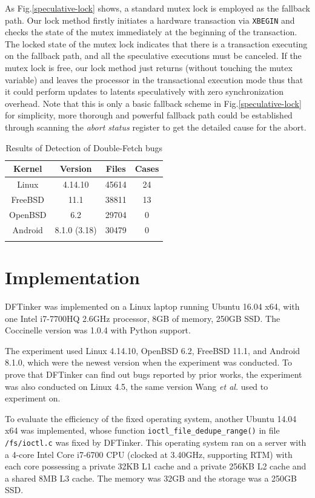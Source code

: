 \documentclass[10pt]{llncs}
\begin{document}
As Fig.\ref{speculative-lock} shows, a standard mutex lock is employed as the fallback path. 
Our lock method firstly initiates a hardware transaction via \verb:XBEGIN: and checks the state of the mutex immediately at the beginning of the transaction. The locked state of the mutex lock indicates that there is a transaction executing on the fallback path, and all the speculative executions must be canceled. 
If the mutex lock is free, our lock method just returns (without touching the mutex variable) and leaves the processor in the transactional execution mode thus that it could perform updates to latents speculatively with zero synchronization overhead. 
Note that this is only a basic fallback scheme in Fig.\ref{speculative-lock} for simplicity, 
more thorough and powerful fallback path could be established through scanning the \textit{abort status} register to get the detailed cause for the abort. 

\begin{table}[t]
  \centering
  \caption{Results of Detection of Double-Fetch bugs}
  \begin{tabular}{cccc}
    \hline
    Kernel & Version & Files & Cases \\   
    \hline
    Linux & 4.14.10 & 45614 & 24 \\
    FreeBSD & 11.1 & 38811 & 13 \\
    OpenBSD & 6.2 & 29704 & 0 \\
    Android & 8.1.0 (3.18) & 30479 & 0 \\
    \hline
    \label{stat}
  \end{tabular}
\end{table}




\section{Implementation}%
\label{imple}
DFTinker was implemented on a Linux laptop running Ubuntu 16.04 x64, with one Intel i7-7700HQ 2.6GHz processor, 8GB of memory, 250GB SSD. The Coccinelle version was 1.0.4 with Python support.

The experiment used Linux 4.14.10, OpenBSD 6.2, FreeBSD 11.1, and Android 8.1.0, which were the newest version when the experiment was conducted. To prove that DFTinker can find out bugs reported by prior works, the experiment was also conducted on Linux 4.5, the same version Wang \textit{et al.} used to experiment on.

To evaluate the efficiency of the fixed operating system, another Ubuntu 14.04 x64 was implemented, whose function \verb:ioctl_file_dedupe_range(): in file \texttt{/fs/ioctl.c} was fixed by DFTinker. This operating system ran on a server with a 4-core Intel Core i7-6700 CPU (clocked at 3.40GHz, supporting RTM) with each core possessing a private 32KB L1 cache and a private 256KB L2 cache and a shared 8MB L3 cache. The memory was 32GB and the storage was a 250GB SSD.
\end{document}
